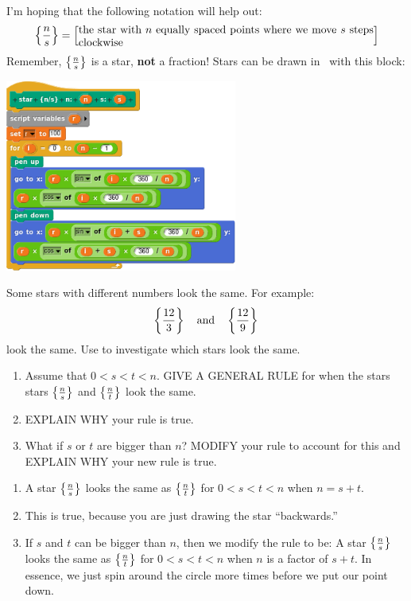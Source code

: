 \documentclass[noauthor,nooutcomes,hints,handout]{ximera}
\begin{document}
I'm hoping that the following notation will help out:
\[
\stringstar{n}{s}=\left[\begin{minipage}{3.7in}
the star with $n$ equally spaced points where we move $s$ steps clockwise
\end{minipage}\right]
\]
Remember, $\left\{\frac{n}{s}\right\}$ is a star, \textbf{not} a fraction!
Stars can be drawn in \snap\ with this block:
\begin{center}
  \includegraphics[width=3in]{starBlockScript.png}
\end{center}





\mynewpage






\begin{question}
  Some stars with different numbers look the same. For example:
  \[
  \left\{\frac{12}{3}\right\}\quad\text{and}\quad\left\{\frac{12}{9}\right\}
  \]
look the same.  Use
 to investigate
which stars look the same.
\begin{enumerate}
  \item Assume that $0 < s < t< n$.  GIVE A GENERAL RULE for when the
    stars stars $\left\{\frac{n}{s}\right\}$ and $\left\{\frac{n}{t}\right\}$ look the
    same.
  \item EXPLAIN WHY your rule is true.
  \item What if $s$ or $t$ are bigger than $n$? MODIFY your rule to
    account for this and EXPLAIN WHY your new rule is true.
\end{enumerate}
\begin{freeResponse}
  \begin{enumerate}
  \item A star $\left\{\frac{n}{s}\right\}$ looks the same as $\left\{\frac{n}{t}\right\}$ for
    $0 < s < t< n$ when $n=s+ t$.
  \item This is true, because you are just drawing the star ``backwards.''
  \item If $s$ and $t$ can be bigger than $n$, then we modify the
    rule to be: A star $\left\{\frac{n}{s}\right\}$ looks the same as
    $\left\{\frac{n}{t}\right\}$ for $0 < s < t< n$ when $n$ is a factor of
    $s+t$. In essence, we just spin around the circle more times
    before we put our point down.
  \end{enumerate}
\end{freeResponse}
\end{question}
\mynewpage
\end{document}
